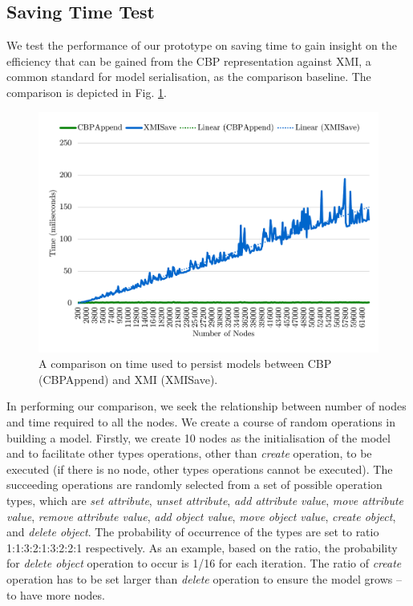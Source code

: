 \documentclass{llncs}
\begin{document}
\subsection{Saving Time Test}
\label{subsec:saving_time_test}
We test the performance of our prototype on saving time to gain insight on the efficiency that can be gained from the CBP representation against XMI, a common standard for model serialisation, as the comparison baseline. The  comparison is depicted in Fig. \ref{fig:append_speed}.

\begin{figure}[ht]
\centering
\includegraphics[width=\linewidth]{append_speed}
\caption{A comparison on time used to persist models between CBP (CBPAppend) and XMI (XMISave).}
\label{fig:append_speed}
\end{figure}

In performing our comparison, we seek the relationship between number of nodes and time required to all the nodes. We create a course of random operations in building a model. 
Firstly, we create 10 nodes as the initialisation of the model and to facilitate other types operations, other than \emph{create} operation, to be executed (if there is no node, other types operations cannot be executed). The succeeding operations are randomly selected from a set of possible operation types, which are \emph{set attribute}, \emph{unset attribute}, \emph{add attribute value}, \emph{move attribute value}, \emph{remove attribute value}, \emph{add object value}, \emph{move object value}, \emph{create object}, and \emph{delete object}. The probability of occurrence of the types are set to ratio 1:1:3:2:1:3:2:2:1 respectively. As an example, based on the ratio, the probability for \emph{delete object} operation to occur is 1/16 for each iteration. The ratio of  \emph{create} operation has to be set larger than \emph{delete} operation to ensure the model grows -- to have more nodes.  
\end{document}
